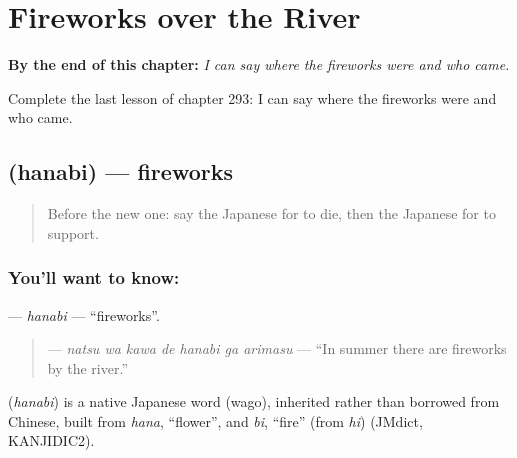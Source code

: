 
\chapter{Fireworks over the River}
\label{ch:ja-fireworks-over-the-river}

\begin{chapteropening}
\textbf{By the end of this chapter:} \emph{I can say where the fireworks were and who came.}

Complete the last lesson of chapter 293: I can say where the fireworks were and who came.
\end{chapteropening}

\section[\texorpdfstring{\ja{はなび} (hanabi)}{はなび (hanabi)}]{ (hanabi) — fireworks}

\label{lesson:JA-C293-hanabi}



\begin{quote}
Before the new one: say the Japanese for to die, then the Japanese for to support.
\end{quote}

\subsection*{You'll want to know: }
\textbf{} — \emph{hanabi} — \textquotedblleft{}fireworks\textquotedblright{}.

\begin{quote}
\textbf{   } — \emph{natsu wa kawa de hanabi ga arimasu} — \textquotedblleft{}In summer there are fireworks by the river.\textquotedblright{}
\end{quote}

\begin{cousinweb}
\textbf{} (\emph{hanabi}) is a native Japanese word (wago), inherited rather than borrowed from Chinese, built from \emph{hana}, \textquotedblleft{}flower\textquotedblright{}, and \emph{bi}, \textquotedblleft{}fire\textquotedblright{} (from \emph{hi}) (JMdict, KANJIDIC2).
\end{cousinweb}

